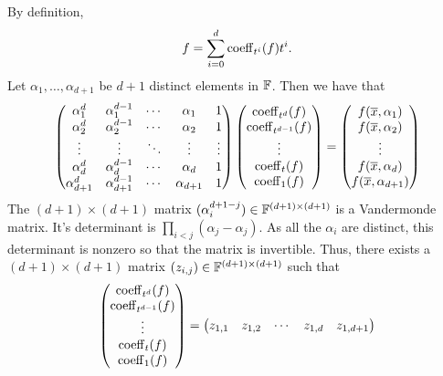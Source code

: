 \documentclass[letterpaper, 11pt]{amsart}
\begin{document}
\begin{pf}
  By definition,
  \[
    f = \sum_{i = 0}^d \operatorname{coeff}_{t^i}(f) t^i.
  \]
  Let $\alpha_1, \ldots, \alpha_{d + 1}$ be $d + 1$ distinct elements in $\mathbb{F}$.
  Then we have that
  \[
    \begin{pmatrix}
      \alpha_1^d & \alpha_1^{d - 1} & \cdots & \alpha_1 & 1 \\
      \alpha_2^d & \alpha_2^{d - 1} & \cdots & \alpha_2 & 1 \\
      \vdots & \vdots & \ddots & \vdots & \vdots \\
      \alpha_{d}^d & \alpha_{d}^{d - 1} & \cdots & \alpha_{d} & 1 \\
      \alpha_{d + 1}^d & \alpha_{d + 1}^{d - 1} & \cdots & \alpha_{d + 1} & 1
    \end{pmatrix}
    \begin{pmatrix}
      \operatorname{coeff}_{t^d}(f) \\
      \operatorname{coeff}_{t^{d-1}}(f) \\
      \vdots \\
      \operatorname{coeff}_{t}(f) \\
      \operatorname{coeff}_{1}(f)
    \end{pmatrix}
    =
    \begin{pmatrix}
      f(\overline{x},\alpha_1) \\
      f(\overline{x},\alpha_2) \\
      \vdots \\
      f(\overline{x},\alpha_d) \\
      f(\overline{x},\alpha_{d+1})
    \end{pmatrix}
  \]
  The $(d + 1) \times (d + 1)$ matrix $(\alpha_i^{d + 1 - j}) \in \mathbb{F}^{(d + 1) \times (d + 1)}$ is a Vandermonde matrix.
  It's determinant is $\prod_{i < j} (\alpha_j - \alpha_j)$.
  As all the $\alpha_i$ are distinct, this determinant is nonzero so that the matrix is invertible.
  Thus, there exists a $(d + 1) \times (d + 1)$ matrix $(z_{i, j}) \in \mathbb{F}^{(d + 1) \times (d + 1)}$ such that
  \[
    \begin{pmatrix}
      \operatorname{coeff}_{t^d}(f) \\
      \operatorname{coeff}_{t^{d-1}}(f) \\
      \vdots \\
      \operatorname{coeff}_{t}(f) \\
      \operatorname{coeff}_{1}(f)
    \end{pmatrix}
    =
    \begin{pmatrix}
      z_{1, 1} & z_{1, 2} & \cdots & z_{1, d} & z_{1, d + 1} \\

\end{pmatrix}\]
\end{pf}
\end{document}

